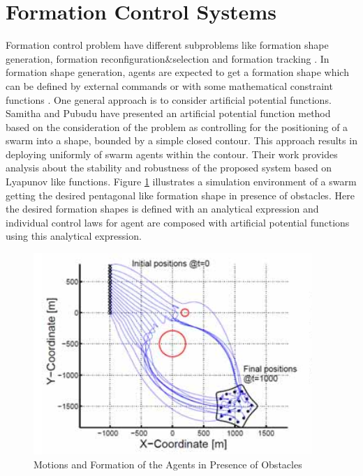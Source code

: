 \section{Formation Control Systems}
Formation control problem have different subproblems like formation shape generation, formation reconfiguration$\&$selection and formation tracking \cite{12}.  
In formation shape generation, agents are expected to get a formation shape which can be defined by external commands or with some mathematical constraint functions \cite{16}.  One general approach is to consider artificial potential functions. Samitha and Pubudu \cite{17} have presented an artificial potential function method  based on the consideration of the problem as controlling for the positioning of a swarm into a shape, bounded by a simple closed contour. This approach results in deploying uniformly of swarm agents within the contour.  Their work provides analysis about the stability and robustness of the proposed system based on Lyapunov like functions. Figure \ref{samitha_obstacle} illustrates a simulation environment of a swarm getting the desired pentagonal like formation shape in presence of obstacles. Here the desired formation shapes is defined with an analytical expression and individual control laws for agent are composed with artificial potential functions using this analytical expression. 

\begin{figure}[H]
	\caption{Motions and Formation of the Agents in Presence of Obstacles \cite{17}} \label{samitha_obstacle}
	\centering
	\includegraphics[scale = 0.7]{samitha}
\end{figure} 

